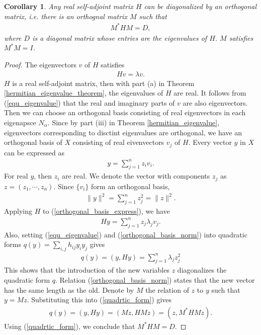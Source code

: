 \documentclass[11pt]{book}
\newtheorem{corollary}{Corollary}[theorem]
\theoremstyle{definition}
\numberwithin{equation}{chapter}
\begin{document}
\begin{corollary}\label{self-adjoint-diagonal}
Any real self-adjoint matrix $H$ can be diagonalized by an orthogonal matrix, i.e. there is an orthognal matrix $M$ such that 
\begin{align*}
    M^* H M = D,
\end{align*}
where $D$ is a diagonal matrix whose entries are the eigenvalues of $H$. $M$ satisfies $M^*M = I$.
\end{corollary}
\begin{proof}
The eigenvectors $v$ of $H$ satisfies 
\begin{align}\label{equ_eigenvalue}
    Hv = \lambda v.
\end{align}
$H$ is a real self-adjoint matrix, then with part (a) in Theorem \ref{hermitian_eigenvalue_theorem}, the eigenvalues of $H$ are real. It follows from (\ref{equ_eigenvalue}) that the real and imaginary parts of $v$ are also eigenvectors. Then we can choose an orthogonal basis consisting of real eigenvectors in each eigenapsce $N_\alpha$. Since by part (iii) in Theorem \ref{hermitian_eigenvalue}, eigenvectors corresponding to disctint eigenvalues are orthogonal, we have an orthogonal basis of $X$ consisting of real eivenvectors $v_j$ of $H$. Every vector $y$ in $X$ can be expressed as
\begin{align}\label{orthogonal_basis_express}
    y = \sum^n_{j=1} z_i v_i.
\end{align}
For real $y$, then $z_i$ are real. We denote the vector with components $z_j$ as $z = \left(z_1, \cdots, z_n\right)$. Since $\{v_i\}$ form an orthogonal basis, 
\begin{align}\label{orthogonal_basis_norm}
    \|y\|^2 = \sum^n_{j=1} z_j^2 = \|z\|^2.
\end{align}
Applying $H$ to (\ref{orthogonal_basis_express}), we have \begin{align*}
    Hy = \sum^n_{j=1} z_j \lambda_j v_j.
\end{align*}
Also, setting (\ref{equ_eigenvalue}) and (\ref{orthogonal_basis_norm}) into quadratic forms $q(y) = \sum_{i,j}h_{ij} y_i y_j$ gives
\begin{align}\label{quadrtic_form}
    q(y) = (y, Hy) = \sum^n_{j=1} \lambda_j z_j^2
\end{align} 
This shows that the introduction of the new variables $z$ diagonalizes the quadratic form $q$. Relation (\ref{orthogonal_basis_norm}) states that the new vector has the same length as the old. Denote by $M$ the relation of $z$ to $y$ such that $y = Mz$. Substituting this into (\ref{quadrtic_form}) gives
\begin{align*}
    q(y) = (y, Hy) = (Mz, HMz) = (z, M^*HMz).
\end{align*}
Using (\ref{quadrtic_form}), we conclude that $M^*HM = D$.
\end{proof}
\end{document}
